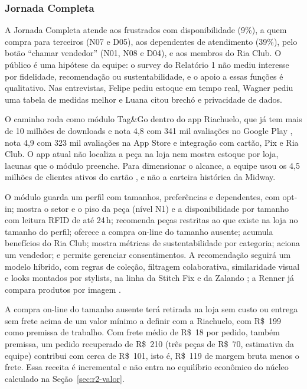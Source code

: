 \subsubsection{Jornada Completa}

A Jornada Completa atende aos frustrados com disponibilidade (9\%), a quem compra para terceiros (N07 e D05), aos dependentes de atendimento (39\%), pelo botão ``chamar vendedor'' (N01, N08 e D04), e aos membros do Ria Club. O público é uma hipótese da equipe: o survey do Relatório 1 não mediu interesse por fidelidade, recomendação ou sustentabilidade, e o apoio a essas funções é qualitativo. Nas entrevistas, Felipe pediu estoque em tempo real, Wagner pediu uma tabela de medidas melhor e Luana citou brechó e privacidade de dados.

O caminho roda como módulo Tag\&Go dentro do app Riachuelo, que já tem mais de 10 milhões de downloads e nota 4,8 com 341 mil avaliações no Google Play \cite{googleplay2026riachuelo}, nota 4,9 com 323 mil avaliações na App Store \cite{appstore2026riachuelo} e integração com cartão, Pix e Ria Club. O app atual não localiza a peça na loja nem mostra estoque por loja, lacunas que o módulo preenche. Para dimensionar o alcance, a equipe usou os 4,5 milhões de clientes ativos do cartão \cite{btg2025guararapes}, e não a carteira histórica da Midway.

O módulo guarda um perfil com tamanhos, preferências e dependentes, com opt-in; mostra o setor e o piso da peça (nível N1) e a disponibilidade por tamanho com leitura RFID de até 24\,h; recomenda peças restritas ao que existe na loja no tamanho do perfil; oferece a compra on-line do tamanho ausente; acumula benefícios do Ria Club; mostra métricas de sustentabilidade por categoria; aciona um vendedor; e permite gerenciar consentimentos. A recomendação seguirá um modelo híbrido, com regras de coleção, filtragem colaborativa, similaridade visual e looks montados por stylists, na linha da Stitch Fix e da Zalando \cite{stitchfix2026algoritmos,zalando2021looks}; a Renner já compara produtos por imagem \cite{infomoney2024renner}.

A compra on-line do tamanho ausente terá retirada na loja sem custo ou entrega sem frete acima de um valor mínimo a definir com a Riachuelo, com R\$~199 como premissa de trabalho. Com frete médio de R\$~18 por pedido, também premissa, um pedido recuperado de R\$~210 (três peças de R\$~70, estimativa da equipe) contribui com cerca de R\$~101, isto é, R\$~119 de margem bruta menos o frete. Essa receita é incremental e não entra no equilíbrio econômico do núcleo calculado na Seção~\ref{sec:r2-valor}.

